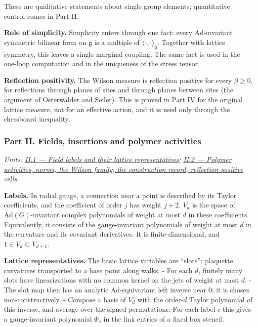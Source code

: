 \documentclass[
  letterpaper,
  11pt]{article}
\begin{document}
These are qualitative statements about single group elements;
quantitative control comes in Part II.

\textbf{Role of simplicity.} Simplicity enters through one fact: every
\(\mathrm{Ad}\)-invariant symmetric bilinear form on \(\mathfrak g\) is
a multiple of \(\langle\cdot,\cdot\rangle_{\mathfrak g}\). Together with
lattice symmetry, this leaves a single marginal coupling. The same fact
is used in the one-loop computation and in the uniqueness of the stress
tensor.

\textbf{Reflection positivity.} The Wilson measure is reflection
positive for every \(\beta\ge0\), for reflections through planes of
sites and through planes between sites (the argument of Osterwalder and
Seiler). This is proved in Part IV for the original lattice measure, not
for an effective action, and it is used only through the chessboard
inequality.

\subsubsection{Part II. Fields, insertions and polymer
activities}\label{part-ii.-fields-insertions-and-polymer-activities}

\emph{Units:
\href{https://github.com/scottnarmstrong/yang-mills-informalization/blob/main/outline/units/II-1.md}{II.1
--- Field labels and their lattice representatives};
\href{https://github.com/scottnarmstrong/yang-mills-informalization/blob/main/outline/units/II-2.md}{II.2
--- Polymer activities, norms, the Wilson family, the construction
record, reflection-positive cells}.}

\textbf{Labels.} In radial gauge, a connection near a point is described
by its Taylor coefficients, and the coefficient of order \(j\) has
weight \(j+2\). \(V_d\) is the space of \(\mathrm{Ad}(G)\)-invariant
complex polynomials of weight at most \(d\) in these coefficients.
Equivalently, it consists of the gauge-invariant polynomials of weight
at most \(d\) in the curvature and its covariant derivatives. It is
finite-dimensional, and \(1\in V_d\subset V_{d+1}\).

\textbf{Lattice representatives.} The basic lattice variables are
``slots'': plaquette curvatures transported to a base point along walks.
- For each \(d\), finitely many slots have linearizations with no common
kernel on the jets of weight at most \(d\). - The slot map then has an
analytic \(\mathrm{Ad}\)-equivariant left inverse near \(0\); it is
chosen non-constructively. - Compose a basis of \(V_d\) with the
order-\(d\) Taylor polynomial of this inverse, and average over the
signed permutations. For each label \(c\) this gives a gauge-invariant
polynomial \(\Phi_c\) in the link entries of a fixed box stencil.
\end{document}
